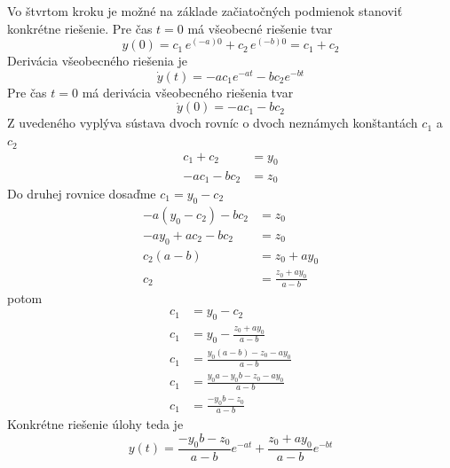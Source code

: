 \documentclass[a4paper, 10pt, ]{article}
\begin{document}
\begin{itemize}[leftmargin=0pt, labelsep=3mm, itemsep=0pt]
    Vo štvrtom kroku je možné na základe začiatočných podmienok stanoviť konkrétne riešenie. Pre čas $t = 0$ má všeobecné riešenie tvar
    \begin{equation}
        y(0)  = c_1 \, e^{(-a) 0} + c_2 \, e^{(-b) 0} = c_1 + c_2   
    \end{equation}
    Derivácia všeobecného riešenia je
    \begin{equation}
        \dot y(t) = -a c_1 e^{-at} - b c_2 e^{-bt}
    \end{equation}
    Pre čas $t = 0$ má derivácia všeobecného riešenia tvar
    \begin{equation}
        \dot y(0)  = -a c_1 - b c_2
    \end{equation}
    Z uvedeného vyplýva sústava dvoch rovníc o dvoch neznámych konštantách $c_1$ a $c_2$
    \begin{subequations}
        \begin{align}
            c_1 + c_2 &= y_0 \\
            -a c_1 - b c_2 &= z_0
        \end{align}
    \end{subequations}
    Do druhej rovnice dosaďme $c_1 = y_0 - c_2$
    \begin{subequations}
        \begin{align}
            -a (y_0 - c_2) - b c_2 &= z_0 \\
            -a y_0 + a c_2 - b c_2 &= z_0 \\
            c_2 (a - b) &= z_0 + a y_0 \\
            c_2 &= \frac{z_0 + a y_0}{a - b}
        \end{align}
    \end{subequations}
    potom
    \begin{subequations}
        \begin{align}
            c_1 &= y_0 - c_2 \\
            c_1 &= y_0 - \frac{z_0 + a y_0}{a - b} \\  
            c_1 &= \frac{y_0 (a - b) - z_0 - a y_0}{a - b}\\
            c_1 &= \frac{y_0 a - y_0 b - z_0 - a y_0}{a - b}\\
            c_1 &= \frac{- y_0 b - z_0}{a - b}          
        \end{align}
    \end{subequations}
    Konkrétne riešenie úlohy teda je
    \begin{equation}
        y(t) = \frac{- y_0 b - z_0}{a - b} e^{-at} + \frac{z_0 + a y_0}{a - b} e^{-bt}
    \end{equation}









\end{itemize}
\end{document}
